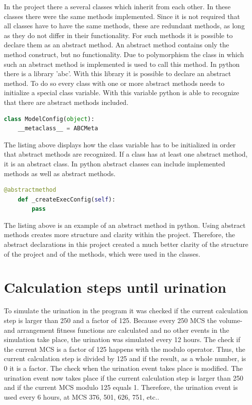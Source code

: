 In the project there a several classes which inherit from each other. In these classes there were the same methods implemented. Since it is not required that all classes have to have the same methods, these are redundant methods, as long as they do not differ in their functionality. For such methods it is possible to declare them as an abstract method. An abstract method contains only the method construct, but no functionality. Due to polymorphism the class in which such an abstract method is implemented is used to call this method. \newline
In python there is a library 'abc'. With this library it is possible to declare an abstract method. To do so every class with one or more abstract methods needs to initialize a special class variable. With this variable python is able to recognize that there are abstract methods included.

\begin{lstlisting}[language=Python, caption = The initialization of a class variable which is required by python in order to detect abstract methods and abstract classes.]
class ModelConfig(object):
    __metaclass__ = ABCMeta
\end{lstlisting}

The listing above displays how the class variable has to be initialized in order that abstract methods are recognized. If a class has at least one abstract method, it is an abstract class. In python abstract classes can include implemented methods as well as abstract methods.

\begin{lstlisting}[language=Python, caption = Declaration of an abstract method.]
    @abstractmethod
    def _createExecConfig(self):
        pass
\end{lstlisting}

The listing above is an example of an abstract method in python. Using abstract methods creates more structure and clarity within the project. Therefore, the abstract declarations in this project created a much better clarity of the structure of the project and of the methods, which were used in the classes.

\section{Calculation steps until urination}\label{sec:calculationStpesUntilUrination}
To simulate the urination in the program it was checked if the current calculation step is larger than 250 and a factor of 125. Because every 250 \ac{MCS} the volume- and arrangement fitness functions are calculated and no other events in the simulation take place, the urination was simulated every 12 hours. The check if the current \ac{MCS} is a factor of 125 happens with the modulo operator. Thus, the current calculation step is divided by 125 and if the result, as a whole number, is 0 it is a factor. \newline
The check when the urination event takes place is modified. The urination event now takes place if the current calculation step is larger than 250 and if the current \ac{MCS} modulo 125 equals 1. Therefore, the urination event is used every 6 hours, at \ac{MCS} 376, 501, 626, 751, etc..

